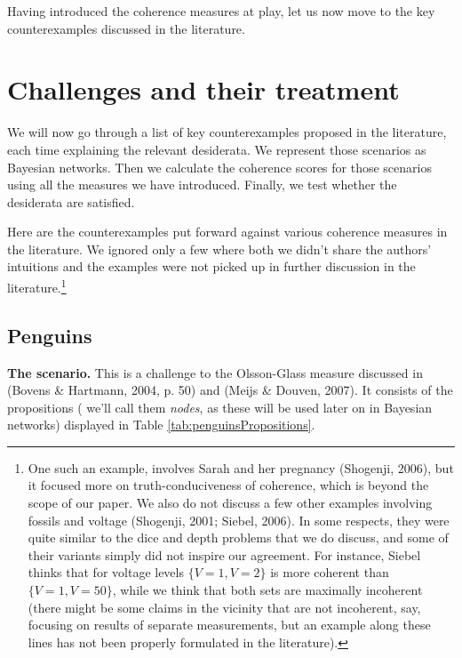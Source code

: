 \documentclass[
  10pt,
]{scrartcl}
\begin{document}
\noindent Having introduced the coherence measures at play, let us now move to the key counterexamples discussed in the literature.

\hypertarget{challenges-and-their-treatment}{%
\section{\texorpdfstring{Challenges and their treatment \label{sec:examples}}{Challenges and their treatment }}\label{challenges-and-their-treatment}}

We will now go through a list of key counterexamples proposed in the literature, each time explaining the relevant desiderata. We represent those scenarios as Bayesian networks. Then we calculate the coherence scores for those scenarios using all the measures we have introduced. Finally, we test whether the desiderata are satisfied.

Here are the counterexamples put forward against various coherence measures in the literature. We ignored only a few where both we didn't share the authors' intuitions and the examples were not picked up in further discussion in the literature.\footnote{One such an example, involves
  Sarah and her pregnancy (Shogenji, 2006), but it focused more
  on truth-conduciveness of coherence, which is beyond the scope of our
  paper. We also do not discuss a few other examples involving fossils
  and voltage (Shogenji, 2001; Siebel, 2006). In some respects,
  they were quite similar to the dice and depth problems that we do
  discuss, and some of their variants simply did not inspire our
  agreement. For instance, Siebel thinks that for voltage levels
  \(\{V=1, V=2\}\) is more coherent than \(\{V=1, V=50\}\), while we
  think that both sets are maximally incoherent (there might be some
  claims in the vicinity that are not incoherent, say, focusing on
  results of separate measurements, but an example along these lines has
  not been properly formulated in the literature).}

\hypertarget{penguins}{%
\subsection{Penguins}\label{penguins}}

\textbf{The scenario.} This is a challenge to the Olsson-Glass measure discussed in (Bovens \& Hartmann, 2004, p. 50) and (Meijs \& Douven, 2007). It consists of the propositions ( we'll call them \emph{nodes}, as these will be used later on in Bayesian networks) displayed in Table \ref{tab:penguinsPropositions}.
\end{document}
